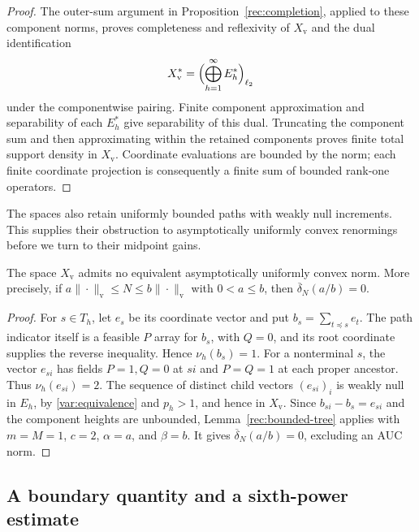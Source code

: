 \begin{proof}
The outer-sum argument in Proposition~\ref{rec:completion}, applied
to these component norms, proves completeness and reflexivity of
$X_{\mathrm v}$ and the dual identification
\[
 X_{\mathrm v}^*=\Bigl(\bigoplus_{h=1}^{\infty}E_h^*\Bigr)_{\ell_2}
\]
under the componentwise pairing. Finite component approximation and
separability of each $E_h^*$ give separability of this dual.
Truncating the component sum and then approximating within the retained
components proves finite total support density in $X_{\mathrm v}$.
Coordinate evaluations are bounded by the norm; each finite coordinate
projection is consequently a finite sum of bounded rank-one operators.
\end{proof}

The spaces also retain uniformly bounded paths with weakly null
increments.  This supplies their obstruction to asymptotically
uniformly convex renormings before we turn to their midpoint gains.

\begin{proposition}\label{var:no-auc}
The space $X_{\mathrm v}$ admits no equivalent asymptotically uniformly
convex norm.  More precisely, if
$a\|\cdot\|_{\mathrm v}\le N\le b\|\cdot\|_{\mathrm v}$ with
$0<a\le b$, then $\overline\delta_N(a/b)=0$.
\end{proposition}

\begin{proof}
For $s\in T_h$, let $e_s$ be its coordinate vector and put
$b_s=\sum_{t\preceq s}e_t$.  The path indicator itself is a feasible
$P$ array for $b_s$, with $Q=0$, and its root coordinate supplies the
reverse inequality. Hence $\nu_h(b_s)=1$. For a nonterminal $s$,
the vector $e_{si}$ has fields $P=1,Q=0$ at $si$ and $P=Q=1$ at
each proper ancestor. Thus $\nu_h(e_{si})=2$. The sequence of
distinct child vectors $(e_{si})_i$ is weakly null in $E_h$, by
\eqref{var:equivalence} and $p_h>1$, and hence in $X_{\mathrm v}$.
Since $b_{si}-b_s=e_{si}$ and the component heights are unbounded,
Lemma~\ref{rec:bounded-tree} applies with $m=M=1$, $c=2$,
$\alpha=a$, and $\beta=b$. It gives
$\overline\delta_N(a/b)=0$, excluding an AUC norm.
\end{proof}

\subsection{A boundary quantity and a sixth-power estimate}

